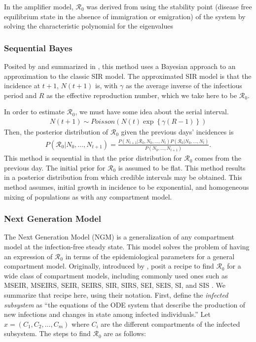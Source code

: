 \documentclass[12pt]{article}
\newcommand{\rr}{\ensuremath{\mathcal{R}_0}}
\begin{document}
In the amplifier model, $\rr$ was derived from using the stability point (disease free equilibrium state in the absence of immigration or emigration) of the system by solving the characteristic polynomial for the eigenvalues


\subsubsection{Sequential Bayes}\label{sec:seqbayes}

Posited by \cite{bettencourt2008} and summarized in \cite{obadia2012r0}, this method uses a Bayesian approach to an approximation to the classic SIR model.  The approximated SIR model is that the incidence at $t+1$, $N(t+1)$ is, with $\gamma$ as the  average inverse of the infectious period and $R$ as the effective reproduction number, which we take here to be $\rr$.

In order to estimate $\rr$, we must have some idea about the serial interval.
\begin{align*}
N(t+1)  \sim Poisson( N(t) \exp \left \{  \gamma (R-1)\right \})
\end{align*}
Then, the posterior distribution of $\rr$ given the previous days' incidences is
\begin{align*}
  P(\rr | N_0, \dots, N_{t+1}) = \frac{P(N_{t+1} | \rr, N_0, \dots, N_t)P(\rr| N_0, \dots, N_t)}{P(N_0, \dots, N_{t+1})}.
\end{align*}
This method is sequential in that the prior distribution for $\rr$ comes from the previous day.  The initial prior for $\rr$ is assumed to be flat.  This method results in a posterior distribution from which credible intervals may be obtained.  This method assumes, initial growth in incidence to be exponential, and homogeneous mixing of populations as with any compartment model.



\subsubsection{Next Generation Model}
\label{sec:ngm}

The Next Generation Model (NGM) is a generalization of any compartment model at the infection-free steady state. This model solves the problem of having an expression of $\rr$ in terms of the epidemiological parameters for a general compartment model.  Originally, introduced by \citep{diekmann1990}, \cite{diekmann2009} posit a recipe to find $\rr$ for a wide class of compartment models, including commonly used ones such as MSEIR, MSEIRS, SEIR, SEIRS, SIR, SIRS, SEI, SEIS, SI, and SIS \citep{hethcote2000}. We summarize that recipe here, using their notation.  First, define the \textit{infected subsystem} as ``the equations of the ODE system that describe the production of new infections and changes in state among infected individuals.''  Let $x = (C_1, C_2, \dots, C_m)$ where $C_i$ are the different compartments of the infected subsystem.  The steps to find $\rr$ are as follows:
\end{document}
